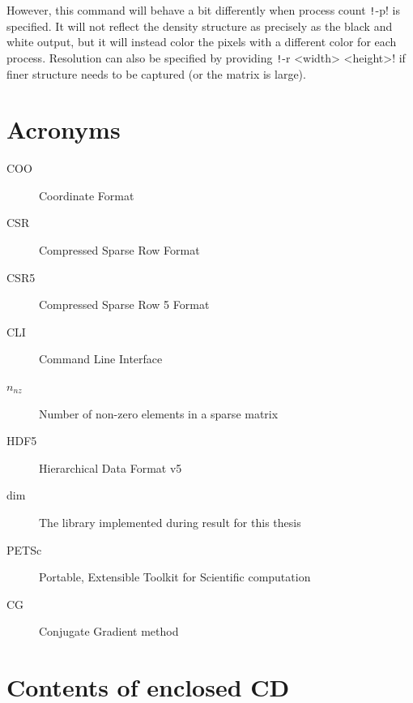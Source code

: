 \documentclass[thesis=M,english]{FITthesis}[2019/12/23]
\newcommand{\csre}[1]{\texttt!#1!}
\begin{document}
However, this command will behave a bit differently when process count \csre{-p} is specified. It will not
reflect the density structure as precisely as the black and white output, but it will instead color the pixels
with a different color for each process. Resolution can also be specified by providing \csre{-r <width> <height>}
if finer structure needs to be captured (or the matrix is large).



\chapter{Acronyms}
\begin{description}
    \item[COO] Coordinate Format
    \item[CSR] Compressed Sparse Row Format
    \item[CSR5] Compressed Sparse Row 5 Format
    \item[CLI] Command Line Interface
    \item[$n_{nz}$] Number of non-zero elements in a sparse matrix
    \item[HDF5] Hierarchical Data Format v5
    \item[dim]  The library implemented during result for this thesis
    \item[PETSc] Portable, Extensible Toolkit for Scientific computation
    \item[CG] Conjugate Gradient method
\end{description}


\chapter{Contents of enclosed CD}

\end{document}
